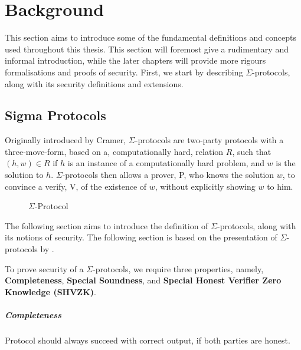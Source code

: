 \chapter{Background}
\label{ch:background}
This section aims to introduce some of the fundamental definitions and concepts
used throughout this thesis. This section will foremost give a rudimentary and
informal introduction, while the later chapters will provide more rigours
formalisations and proofs of security.
First, we start by describing $\Sigma$-protocols, along with its security
definitions and extensions.


\section{Sigma Protocols}
\label{sec:sigma_protocols}
Originally introduced by Cramer, $\Sigma$-protocols are two-party protocols with a
three-move-form, based on a, computationally hard, relation $R$, such that $(h, w) \in R$
if $h$ is an instance of a computationally hard problem, and $w$ is
the solution to $h$. $\Sigma$-protocols then allows a prover, P, who knows the
solution $w$, to convince a verify, V, of the existence of $w$, without
explicitly showing $w$ to him.

\begin{figure}[ht]
  \centering
  \caption{\label{fig:proto_sigma} $\Sigma$-Protocol}
\end{figure}


The following section aims to introduce the definition of $\Sigma$-protocols,
along with its notions of security. The following section is based on the
presentation of $\Sigma$-protocols by \citet{on-sigma-protocols}.


To prove security of a $\Sigma$-protocols, we require three properties, namely,
\textbf{Completeness}, \textbf{Special Soundness}, and \textbf{Special Honest Verifier Zero Knowledge (SHVZK)}.

\paragraph{Completeness}
Protocol should always succeed with correct output, if both parties are honest.

